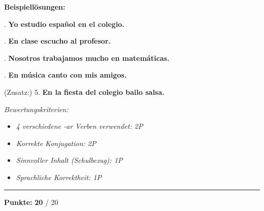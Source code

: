 \documentclass[11pt, a4paper]{article}
\newcommand{\maxpunkte}{20}
\newcommand{\loesung}[1]{\textcolor{loesung}{\textbf{#1}}}
\begin{document}
\textbf{Beispiellösungen:}

\vspace{0.5em}

. \loesung{Yo estudio español en el colegio.}

\vspace{0.8em}

. \loesung{En clase escucho al profesor.}

\vspace{0.8em}

. \loesung{Nosotros trabajamos mucho en matemáticas.}

\vspace{0.8em}

. \loesung{En música canto con mis amigos.}

\vspace{0.8em}

\noindent
(Zusatz:) 5. \loesung{En la fiesta del colegio bailo salsa.}

\vspace{1em}

\textit{\textcolor{grau}{Bewertungskriterien:}}
\begin{itemize}[leftmargin=2em]
    \item \textit{\textcolor{grau}{4 verschiedene -ar Verben verwendet: 2P}}
    \item \textit{\textcolor{grau}{Korrekte Konjugation: 2P}}
    \item \textit{\textcolor{grau}{Sinnvoller Inhalt (Schulbezug): 1P}}
    \item \textit{\textcolor{grau}{Sprachliche Korrektheit: 1P}}
\end{itemize}


\vspace{20pt}
\hrule
\vspace{10pt}

\begin{flushright}
\textbf{Punkte:} \loesung{\maxpunkte} / \maxpunkte
\end{flushright}
\end{document}

